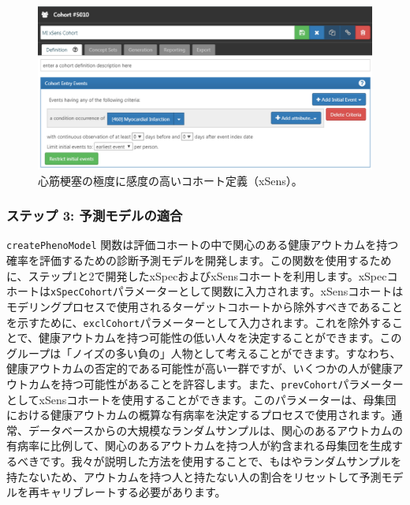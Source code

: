 \documentclass[
  11pt]{book}
\theoremstyle{definition}
\theoremstyle{definition}
\theoremstyle{definition}
\theoremstyle{definition}
\theoremstyle{remark}
\begin{document}
\begin{figure}

{\centering \includegraphics[width=1\linewidth]{images/ClinicalValidity/xSens} 

}

\caption{心筋梗塞の極度に感度の高いコホート定義（xSens）。}\label{fig:xSens}
\end{figure}

\subsubsection*{ステップ 3: 予測モデルの適合}\label{ux30b9ux30c6ux30c3ux30d7-3-ux4e88ux6e2cux30e2ux30c7ux30ebux306eux9069ux5408}

\texttt{createPhenoModel} 関数は評価コホートの中で関心のある健康アウトカムを持つ確率を評価するための診断予測モデルを開発します。この関数を使用するために、ステップ1と2で開発したxSpecおよびxSensコホートを利用します。xSpecコホートは\texttt{xSpecCohort}パラメーターとして関数に入力されます。xSensコホートはモデリングプロセスで使用されるターゲットコホートから除外すべきであることを示すために、\texttt{exclCohort}パラメーターとして入力されます。これを除外することで、健康アウトカムを持つ可能性の低い人々を決定することができます。このグループは「ノイズの多い負の」人物として考えることができます。すなわち、健康アウトカムの否定的である可能性が高い一群ですが、いくつかの人が健康アウトカムを持つ可能性があることを許容します。また、\texttt{prevCohort}パラメーターとしてxSensコホートを使用することができます。このパラメーターは、母集団における健康アウトカムの概算な有病率を決定するプロセスで使用されます。通常、データベースからの大規模なランダムサンプルは、関心のあるアウトカムの有病率に比例して、関心のあるアウトカムを持つ人が約含まれる母集団を生成するべきです。我々が説明した方法を使用することで、もはやランダムサンプルを持たないため、アウトカムを持つ人と持たない人の割合をリセットして予測モデルを再キャリブレートする必要があります。
\end{document}
